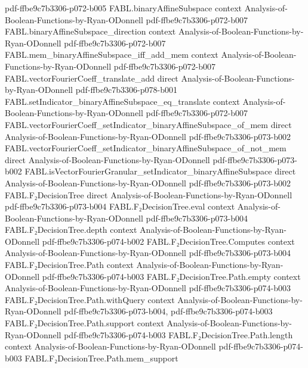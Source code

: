 \begin{theorem}
  {pdf-ffbe9c7b3306-p072-b005}
\proofstep
  {FABL.binaryAffineSubspace}
  {context}
  {Analysis-of-Boolean-Functions-by-Ryan-ODonnell}
  {pdf-ffbe9c7b3306-p072-b007}
\proofstep
  {FABL.binaryAffineSubspace_direction}
  {context}
  {Analysis-of-Boolean-Functions-by-Ryan-ODonnell}
  {pdf-ffbe9c7b3306-p072-b007}
\proofstep
  {FABL.mem_binaryAffineSubspace_iff_add_mem}
  {context}
  {Analysis-of-Boolean-Functions-by-Ryan-ODonnell}
  {pdf-ffbe9c7b3306-p072-b007}
\proofstep
  {FABL.vectorFourierCoeff_translate_add}
  {direct}
  {Analysis-of-Boolean-Functions-by-Ryan-ODonnell}
  {pdf-ffbe9c7b3306-p078-b001}
\proofstep
  {FABL.setIndicator_binaryAffineSubspace_eq_translate}
  {context}
  {Analysis-of-Boolean-Functions-by-Ryan-ODonnell}
  {pdf-ffbe9c7b3306-p072-b007}
\proofstep
  {FABL.vectorFourierCoeff_setIndicator_binaryAffineSubspace_of_mem}
  {direct}
  {Analysis-of-Boolean-Functions-by-Ryan-ODonnell}
  {pdf-ffbe9c7b3306-p073-b002}
\proofstep
  {FABL.vectorFourierCoeff_setIndicator_binaryAffineSubspace_of_not_mem}
  {direct}
  {Analysis-of-Boolean-Functions-by-Ryan-ODonnell}
  {pdf-ffbe9c7b3306-p073-b002}
\proofstep
  {FABL.isVectorFourierGranular_setIndicator_binaryAffineSubspace}
  {direct}
  {Analysis-of-Boolean-Functions-by-Ryan-ODonnell}
  {pdf-ffbe9c7b3306-p073-b002}
\proofstep
  {FABL.F₂DecisionTree}
  {direct}
  {Analysis-of-Boolean-Functions-by-Ryan-ODonnell}
  {pdf-ffbe9c7b3306-p073-b004}
\proofstep
  {FABL.F₂DecisionTree.eval}
  {context}
  {Analysis-of-Boolean-Functions-by-Ryan-ODonnell}
  {pdf-ffbe9c7b3306-p073-b004}
\proofstep
  {FABL.F₂DecisionTree.depth}
  {context}
  {Analysis-of-Boolean-Functions-by-Ryan-ODonnell}
  {pdf-ffbe9c7b3306-p074-b002}
\proofstep
  {FABL.F₂DecisionTree.Computes}
  {context}
  {Analysis-of-Boolean-Functions-by-Ryan-ODonnell}
  {pdf-ffbe9c7b3306-p073-b004}
\proofstep
  {FABL.F₂DecisionTree.Path}
  {context}
  {Analysis-of-Boolean-Functions-by-Ryan-ODonnell}
  {pdf-ffbe9c7b3306-p074-b003}
\proofstep
  {FABL.F₂DecisionTree.Path.empty}
  {context}
  {Analysis-of-Boolean-Functions-by-Ryan-ODonnell}
  {pdf-ffbe9c7b3306-p074-b003}
\proofstep
  {FABL.F₂DecisionTree.Path.withQuery}
  {context}
  {Analysis-of-Boolean-Functions-by-Ryan-ODonnell}
  {pdf-ffbe9c7b3306-p073-b004,
    pdf-ffbe9c7b3306-p074-b003}
\proofstep
  {FABL.F₂DecisionTree.Path.support}
  {context}
  {Analysis-of-Boolean-Functions-by-Ryan-ODonnell}
  {pdf-ffbe9c7b3306-p074-b003}
\proofstep
  {FABL.F₂DecisionTree.Path.length}
  {context}
  {Analysis-of-Boolean-Functions-by-Ryan-ODonnell}
  {pdf-ffbe9c7b3306-p074-b003}
\proofstep
  {FABL.F₂DecisionTree.Path.mem_support}

\end{theorem}
